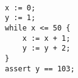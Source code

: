 		\begin{lstlisting}[]  % Start your code-block

x := 0;
y := 1;
while x <= 50 {
    x := x + 1;
    y := y + 2;
}
assert y == 103;
	\end{lstlisting}